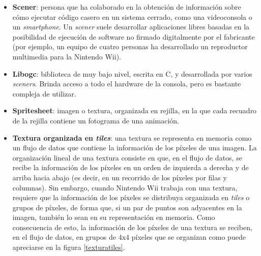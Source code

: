 \begin{itemize}
\item \textbf{Scener}: persona que ha colaborado en la obtención de información sobre cómo ejecutar código casero en un sistema cerrado, como una videoconsola o un \emph{smartphone}. Un \emph{scener} suele desarrollar aplicaciones libres basadas en la posibilidad de ejecución de software no firmado digitalmente por el fabricante (por ejemplo, un equipo de cuatro personas ha desarrollado un reproductor multimedia para la Nintendo Wii).
\item \textbf{Libogc}: biblioteca de muy bajo nivel, escrita en C, y desarrollada por varios \emph{sceners}. Brinda acceso a todo el hardware de la consola, pero es bastante compleja de utilizar.
\item \textbf{Spritesheet}: imagen o textura, organizada en rejilla, en la que cada recuadro de la rejilla contiene un fotograma de una animación.
\item \textbf{Textura organizada en \emph{tiles}}: una textura se representa en memoria como un flujo de datos que contiene la información de los píxeles de una imagen. La organización lineal de una textura consiste en que, en el flujo de datos, se recibe la información de los píxeles en un orden de izquierda a derecha y de arriba hacia abajo (es decir, en un recorrido de los píxeles por filas y columnas). Sin embargo, cuando Nintendo Wii trabaja con una textura, requiere que la información de los píxeles se distribuya organizada en \emph{tiles} o grupos de píxeles, de forma que, si un par de puntos son adyacentes en la imagen, también lo sean en su representación en memoria. Como consecuencia de esto, la información de los píxeles de una textura se reciben, en el flujo de datos, en grupos de 4x4 píxeles que se organizan como puede apreciarse en la figura \ref{texturatiles}.\\



\end{itemize}
